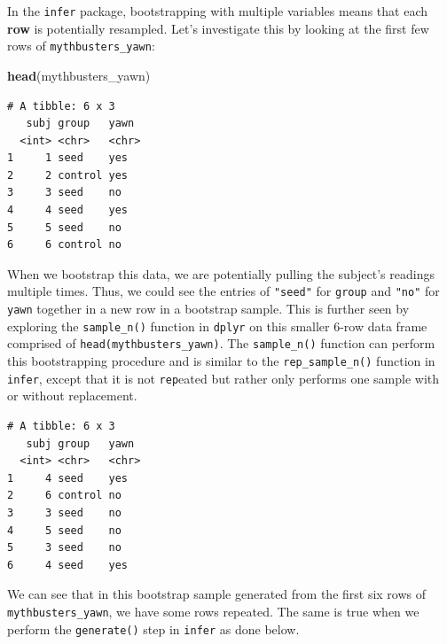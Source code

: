 \documentclass[12pt, krantz2,]{krantz}
\makeatletter
\newenvironment{Shaded}{\begin{snugshade}}{\end{snugshade}}
\newcommand{\DataTypeTok}[1]{\textcolor[rgb]{0.27,0.27,0.27}{#1}}
\newcommand{\DecValTok}[1]{\textcolor[rgb]{0.06,0.06,0.06}{#1}}
\newcommand{\KeywordTok}[1]{\textcolor[rgb]{0.27,0.27,0.27}{\textbf{#1}}}
\newcommand{\NormalTok}[1]{#1}
\newcommand{\OperatorTok}[1]{\textcolor[rgb]{0.43,0.43,0.43}{\textbf{#1}}}
\newcommand{\OtherTok}[1]{\textcolor[rgb]{0.37,0.37,0.37}{#1}}
\newcommand{\StringTok}[1]{\textcolor[rgb]{0.5,0.5,0.5}{#1}}
\newenvironment{kframe}{%
\medskip{}
\setlength{\fboxsep}{.8em}
 \def\at@end@of@kframe{}%
 \ifinner\ifhmode%
  \def\at@end@of@kframe{\end{minipage}}%
  \begin{minipage}{\columnwidth}%
 \fi\fi%
 \def\FrameCommand##1{\hskip\@totalleftmargin \hskip-\fboxsep
 \colorbox{shadecolor}{##1}\hskip-\fboxsep
     \hskip-\linewidth \hskip-\@totalleftmargin \hskip\columnwidth}%
 \MakeFramed {\advance\hsize-\width
   \@totalleftmargin\z@ \linewidth\hsize
   \@setminipage}}%
 {\par\unskip\endMakeFramed%
 \at@end@of@kframe}
\renewenvironment{Shaded}{\begin{kframe}}{\end{kframe}}
\makeatother
\begin{document}
In the \texttt{infer} package, bootstrapping with multiple variables means that each \textbf{row} is potentially resampled. Let's investigate this by looking at the first few rows of \texttt{mythbusters\_yawn}:

\begin{Shaded}
\begin{Highlighting}[]
\KeywordTok{head}\NormalTok{(mythbusters_yawn)}
\end{Highlighting}
\end{Shaded}

\begin{verbatim}
# A tibble: 6 x 3
   subj group   yawn 
  <int> <chr>   <chr>
1     1 seed    yes  
2     2 control yes  
3     3 seed    no   
4     4 seed    yes  
5     5 seed    no   
6     6 control no   
\end{verbatim}

When we bootstrap this data, we are potentially pulling the subject's readings multiple times. Thus, we could see the entries of \texttt{"seed"} for \texttt{group} and \texttt{"no"} for \texttt{yawn} together in a new row in a bootstrap sample. This is further seen by exploring the \texttt{sample\_n()} function in \texttt{dplyr} on this smaller 6-row data frame comprised of \texttt{head(mythbusters\_yawn)}. The \texttt{sample\_n()} function can perform this bootstrapping procedure and is similar to the \texttt{rep\_sample\_n()} function in \texttt{infer}, except that it is not \texttt{rep}eated but rather only performs one sample with or without replacement.

\begin{Shaded}
\end{Shaded}

\begin{verbatim}
# A tibble: 6 x 3
   subj group   yawn 
  <int> <chr>   <chr>
1     4 seed    yes  
2     6 control no   
3     3 seed    no   
4     5 seed    no   
5     3 seed    no   
6     4 seed    yes  
\end{verbatim}

We can see that in this bootstrap sample generated from the first six rows of \texttt{mythbusters\_yawn}, we have some rows repeated. The same is true when we perform the \texttt{generate()} step in \texttt{infer} as done below.
\end{document}
